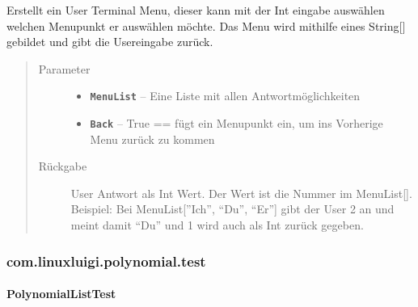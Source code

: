 \documentclass[letterpaper,10pt,ngerman]{sphinxmanual}
\begin{document}
\begin{fulllineitems}
\label{com/linuxluigi/polynomial/TerminalInterface:com.linuxluigi.polynomial.TerminalInterface.ShowMenu(String__, boolean)}
Erstellt ein User Terminal Menu, dieser kann mit der Int eingabe auswählen welchen Menupunkt er auswählen möchte. Das Menu wird mithilfe eines String{[}{]} gebildet und gibt die Usereingabe zurück.
\begin{quote}\begin{description}
\item[{Parameter}] \leavevmode\begin{itemize}
\item {} 
\textbf{\texttt{MenuList}} -- Eine Liste mit allen Antwortmöglichkeiten

\item {} 
\textbf{\texttt{Back}} -- True == fügt ein Menupunkt ein, um ins Vorherige Menu zurück zu kommen

\end{itemize}

\item[{Rückgabe}] \leavevmode
User Antwort als Int Wert. Der Wert ist die Nummer im MenuList{[}{]}. Beispiel: Bei MenuList{[}''Ich'', ``Du'', ``Er''{]} gibt der User 2 an und meint damit ``Du'' und 1 wird auch als Int zurück gegeben.

\end{description}\end{quote}

\end{fulllineitems}



\subsubsection{com.linuxluigi.polynomial.test}
\label{com/linuxluigi/polynomial/test/package-index:com-linuxluigi-polynomial-test}\label{com/linuxluigi/polynomial/test/package-index::doc}\label{com/linuxluigi/polynomial/test/package-index:package-com.linuxluigi.polynomial.test}

\paragraph{PolynomialListTest}
\label{com/linuxluigi/polynomial/test/PolynomialListTest::doc}\label{com/linuxluigi/polynomial/test/PolynomialListTest:polynomiallisttest}
\end{document}

